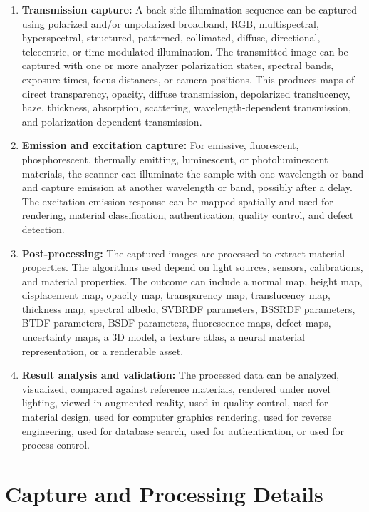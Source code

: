 \documentclass[11pt, twoside, listof=totocnumbered, bibliography=totocnumbered]{scrartcl}
\begin{document}
\begin{enumerate}
		\item \textbf{Transmission capture:} A back-side illumination sequence can be captured using polarized and/or unpolarized broadband, RGB, multispectral, hyperspectral, structured, patterned, collimated, diffuse, directional, telecentric, or time-modulated illumination. The transmitted image can be captured with one or more analyzer polarization states, spectral bands, exposure times, focus distances, or camera positions. This produces maps of direct transparency, opacity, diffuse transmission, depolarized translucency, haze, thickness, absorption, scattering, wavelength-dependent transmission, and polarization-dependent transmission.
		
		\item \textbf{Emission and excitation capture:} For emissive, fluorescent, phosphorescent, thermally emitting, luminescent, or photoluminescent materials, the scanner can illuminate the sample with one wavelength or band and capture emission at another wavelength or band, possibly after a delay. The excitation-emission response can be mapped spatially and used for rendering, material classification, authentication, quality control, and defect detection.
		
		\item \textbf{Post-processing:} The captured images are processed to extract material properties. The algorithms used depend on light sources, sensors, calibrations, and material properties. The outcome can include a normal map, height map, displacement map, opacity map, transparency map, translucency map, thickness map, spectral albedo, SVBRDF parameters, BSSRDF parameters, BTDF parameters, BSDF parameters, fluorescence maps, defect maps, uncertainty maps, a 3D model, a texture atlas, a neural material representation, or a renderable asset.
		
		\item \textbf{Result analysis and validation:} The processed data can be analyzed, visualized, compared against reference materials, rendered under novel lighting, viewed in augmented reality, used in quality control, used for material design, used for computer graphics rendering, used for reverse engineering, used for database search, used for authentication, or used for process control.
	\end{enumerate}
	
	\section{Capture and Processing Details}
	
\end{document}
